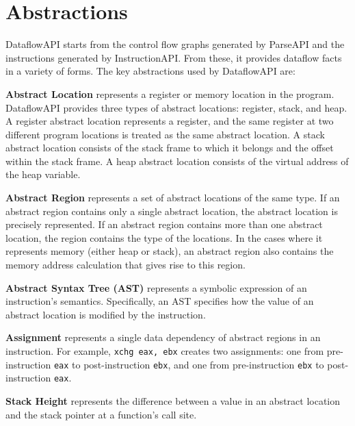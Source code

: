 \section{Abstractions}
\label{sec:abstractions}

DataflowAPI starts from the control flow graphs generated by ParseAPI and the instructions generated by InstructionAPI.
From these, it provides dataflow facts in a variety of forms. The key abstractions used by DataflowAPI are:

\begin{itemize}[leftmargin=0pt,label=$\circ$]
{\item \textbf{Abstract Location}
represents a register or memory location in the program.
DataflowAPI provides three types of abstract locations: register, stack, and
heap. A register abstract location represents a register, and the same register at two
different program locations is treated as the same abstract location.
A stack abstract location consists of the stack frame to which it belongs and
the offset within the stack frame.
A heap abstract location consists of the virtual address of the heap variable.
}

{\item \textbf{Abstract Region}
represents a set of abstract locations of the same type.
If an abstract region contains only a single abstract location, the
abstract location is precisely represented.
If an abstract region contains more than one abstract location, the region
contains the type of the locations. In the cases where it represents memory
(either heap or stack), an abstract region also contains
the memory address calculation that gives rise to this region.
}

{\item \textbf{Abstract Syntax Tree (AST)}
represents a symbolic expression of an instruction's semantics.
Specifically, an AST specifies how the value of an abstract location is modified by the
instruction.
}

{\item \textbf{Assignment}
represents a single data dependency of abstract regions in an instruction. For example, \texttt{xchg eax, ebx} creates two assignments: one from pre-instruction \texttt{eax} to post-instruction \texttt{ebx}, and one from pre-instruction \texttt{ebx} to post-instruction \texttt{eax}.
}

{\item \textbf{Stack Height}
represents the difference between a value in an abstract location and the stack pointer at a function's call site.
}
\end{itemize}



